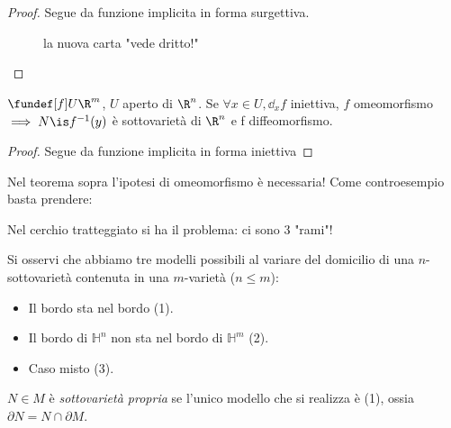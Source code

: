 \begin{proof}
 Segue da funzione implicita in forma surgettiva.
 \begin{figure}
  \centering
  
  \caption{la nuova carta "vede dritto!"}
 \end{figure}

\end{proof}
\begin{prop}
 $\fundef[f] U\R^m$, $U$ aperto di $\R^n$. Se $\forall x \in U, \dd_xf$ iniettiva, $f$ omeomorfismo$\implies N\is f^{-1}(y)$ è sottovarietà di $\R^n$ e f diffeomorfismo.
\end{prop}
\begin{proof}
 Segue da funzione implicita in forma iniettiva
\end{proof}
\begin{oss}
 Nel teorema sopra l'ipotesi di omeomorfismo è necessaria!
 Come controesempio basta prendere:
 \begin{center}
  \centering
  
 \end{center}
 Nel cerchio tratteggiato si ha il problema: ci sono 3 "rami"!
\end{oss}
Si osservi che abbiamo tre modelli possibili al variare del domicilio di una  $n$-sottovarietà contenuta in una $m$-varietà ($n\le m$):
\begin{itemize}
 \item Il bordo sta nel bordo (1).
 \item Il bordo di $\mathbb H^n$ non sta nel bordo di $\mathbb H^m$ (2).
 \item Caso misto (3).
\end{itemize}
\begin{center}
 
\end{center}

\begin{defn}
 $N\in M$ è \emph{sottovarietà propria} se l'unico modello che si realizza è (1), ossia $\partial N = N\cap \partial M$.

\end{defn}
